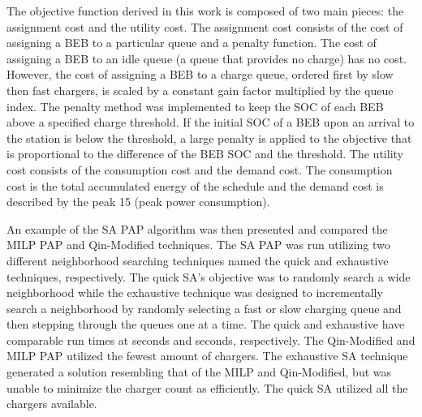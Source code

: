 \documentclass[11pt,a4paper,final]{article}
\newcommand{\tempcnt}{1517 }                                                    %
\newcommand{\quicklocal}{0.45 }                                                 %
\newcommand{\exhaustivelocal}{0.5 }                                             %
\begin{document}
The objective function derived in this work is composed of two main pieces: the assignment cost and the utility cost.
The assignment cost consists of the cost of assigning a BEB to a particular queue and a penalty function. The cost of
assigning a BEB to an idle queue (a queue that provides no charge) has no cost. However, the cost of assigning a BEB to
a charge queue, ordered first by slow then fast chargers, is scaled by a constant gain factor multiplied by the queue
index. The penalty method was implemented to keep the SOC of each BEB above a specified charge threshold. If the initial
SOC of a BEB upon an arrival to the station is below the threshold, a large penalty is applied to the objective that is
proportional to the difference of the BEB SOC and the threshold. The utility cost consists of the consumption cost and
the demand cost. The consumption cost is the total accumulated energy of the schedule and the demand cost is described
by the peak 15 (peak power consumption).

An example of the SA PAP algorithm was then presented and compared the MILP PAP and Qin-Modified techniques. The SA PAP
was run utilizing two different neighborhood searching techniques named the quick and exhaustive techniques,
respectively. The quick SA's objective was to randomly search a wide neighborhood while the exhaustive technique was
designed to incrementally search a neighborhood by randomly selecting a fast or slow charging queue and then stepping
through the queues one at a time. The quick and exhaustive have comparable run times at \fpeval{\quicklocal * \tempcnt} seconds and \fpeval{\exhaustivelocal * \tempcnt} seconds, respectively. The Qin-Modified and MILP
PAP utilized the fewest amount of chargers. The exhaustive SA technique generated a solution resembling that of the MILP
and Qin-Modified, but was unable to minimize the charger count as efficiently. The quick SA utilized all the chargers
available.
\end{document}

